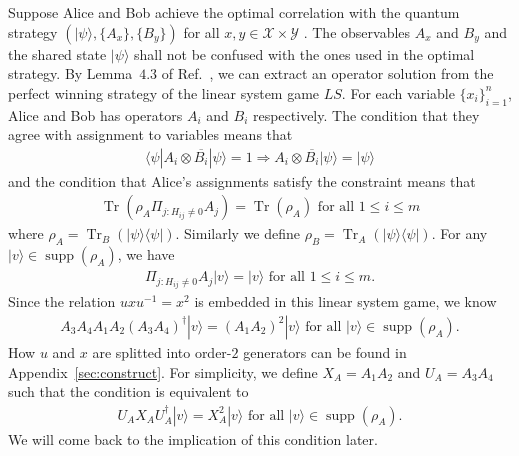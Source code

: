 \documentclass[11pt,letterpaper]{article}
\newcommand{\ket}[1]{|#1\rangle}
\newcommand{\bra}[1]{\langle#1|}
\newcommand{\ketbra}[2]{|#1\rangle\langle#2|}
\DeclareMathOperator{\Tr}{Tr}
\DeclareMathOperator{\supp}{supp}
\newcommand{\calX}{\mathcal{X}}
\newcommand{\calY}{\mathcal{Y}}
\newcommand{\1}{\mathbb{1}}
\newcommand{\LS}{LS}
\theoremstyle{definition}
\begin{document}
Suppose Alice and Bob achieve the optimal correlation with the quantum strategy $(\ket{\psi}, \{A_x\}, \{B_y\})$
for all $x,y \in \calX \times \calY$ .
The observables $A_x$ and $B_y$ and the shared state $\ket{\psi}$ shall not be confused with the ones used in the optimal strategy.
By Lemma~$4.3$ of Ref.~\cite{coladan2017}, we can extract an operator solution from the perfect winning strategy 
of the linear system game $\LS$. 
For each variable $\{ x_i \}_{i=1}^n$, Alice and Bob has operators $A_i$ and $B_i$ respectively.
The condition that they agree with assignment to variables means that 
\begin{align}
	\bra{\psi} A_i \otimes \overline{B_i} \ket{\psi} = 1 \Rightarrow A_i \otimes \overline{B_i} \ket{\psi} = \ket{\psi}
\end{align}
and the condition that Alice's assignments satisfy the constraint means that 
\begin{align}
	\Tr(\rho_A \Pi_{j: H_{ij} \neq 0} A_j) = \Tr(\rho_A) \text{ for all } 1 \leq i \leq m
\end{align}
where $\rho_A =  \Tr_B(\ketbra{\psi}{\psi})$. 
Similarly we define $\rho_B = \Tr_A(\ketbra{\psi}{\psi})$.
For any $\ket{v} \in \supp(\rho_A)$,
we have 
\begin{align}
\Pi_{j:H_{ij} \neq 0} A_j \ket{v} = \ket{v} \text{ for all } 1 \leq i \leq m.
\end{align}
Since the relation $uxu^{-1} = x^2$ is embedded in this linear system game, we know
\begin{align}
	A_3A_4 A_1A_2 (A_3A_4)^\dagger \ket{v}= (A_1A_2)^2 \ket{v} \text{ for all } \ket{v} \in \supp(\rho_A).
\end{align}
How $u$ and $x$ are splitted into order-$2$ generators can be found in Appendix~\ref{sec:construct}.
For simplicity, we define $X_A = A_1A_2$ and $U_A=A_3A_4$ such that
the condition is equivalent to
\begin{align}
	\label{eq:ux_relation}
	U_AX_AU_A^\dagger \ket{v} = X_A^2 \ket{v} \text{ for all } \ket{v} \in \supp(\rho_A).
\end{align}
We will come back to the implication of this condition later.
\end{document}
